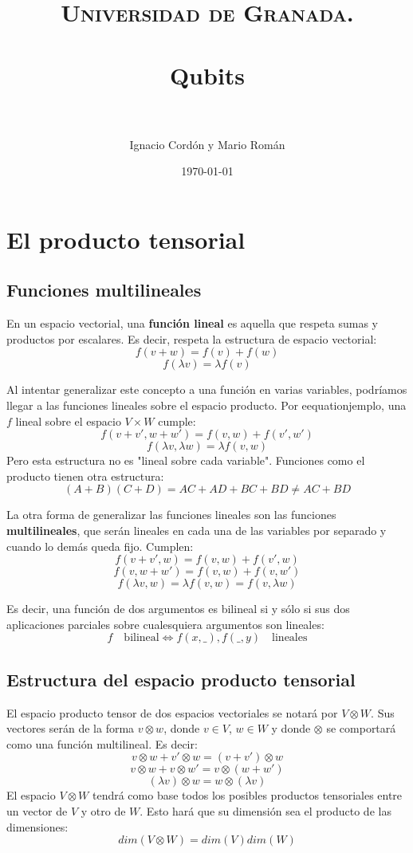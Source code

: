 \documentclass[paper=a4, fontsize=11pt, spanish]{scrartcl}
\title{
  \normalfont \normalsize 
  \textsc{Universidad de Granada.} \\ [25pt] %
  \horrule{0.5pt} \\[0.4cm] %
  \huge Qubits \\ %
  \horrule{2pt} \\[0.5cm] %
}
\author{Ignacio Cordón y Mario Román} %
\date{\normalsize\today} %
\numberwithin{equation}{section} %
\numberwithin{figure}{section} %
\numberwithin{table}{section} %
\begin{document}
\maketitle %

\section {El producto tensorial}
  \subsection {Funciones multilineales}
    En un espacio vectorial, una \textbf{función lineal} es aquella que respeta sumas y productos por escalares.
    Es decir, respeta la estructura de espacio vectorial:
    $$ f(v+w) = f(v) + f(w) $$
    $$ f(\lambda v) = \lambda f(v) $$

    Al intentar generalizar este concepto a una función en varias variables, podríamos llegar a las funciones 
    lineales sobre el espacio producto. Por eequationjemplo, una $f$ lineal sobre el espacio $V \times W$ cumple:
    $$ f(v+v',w+w') = f(v,w) + f(v',w')$$
    $$ f(\lambda v, \lambda w) = \lambda f(v,w) $$
    Pero esta estructura no es "lineal sobre cada variable". Funciones como el producto tienen otra
    estructura:
    $$ (A+B)(C+D) = AC+AD+BC+BD \neq AC+BD $$
    
    La otra forma de generalizar las funciones lineales son las funciones \textbf{multilineales}, que serán lineales
    en cada una de las variables por separado y cuando lo demás queda fijo. Cumplen:
    $$ f(v+v',w) = f(v,w) + f(v',w) $$
    $$ f(v,w+w') = f(v,w) + f(v,w') $$
    $$ f(\lambda v,w) = \lambda f(v,w) = f(v,\lambda w) $$

    Es decir, una función de dos argumentos es bilineal si y sólo si sus dos aplicaciones parciales sobre
    cualesquiera argumentos son lineales:
    $$ f\quad \mbox{bilineal} \Leftrightarrow f(x,\_), f(\_,y)\quad \mbox{lineales} $$
    
  \subsection{Estructura del espacio producto tensorial}
    El espacio producto tensor de dos espacios vectoriales se notará por $V \otimes W$. Sus vectores serán de
    la forma $v \otimes w$, donde $v \in V$, $w \in W$ y donde $\otimes$ se comportará como una función multilineal.
    Es decir:
    $$ v \otimes w + v' \otimes w  = (v+v') \otimes w $$
    $$ v \otimes w + v \otimes w'  = v \otimes (w+w') $$
    $$ (\lambda v) \otimes w = w \otimes (\lambda v)  $$
    El espacio $V \otimes W$ tendrá como base todos los posibles productos tensoriales entre un vector de $V$ y otro
    de $W$. Esto hará que su dimensión sea el producto de las dimensiones:
    $$ dim(V \otimes W) = dim(V)dim(W) $$
    
\end{document}

